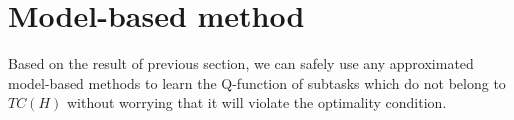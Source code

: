 \documentclass{article} %
\newtheorem{theorem}{Theorem}
\begin{document}







\section{Model-based method}
\label{se:Model}

Based on the result of previous section, we can safely use any approximated model-based methods 
to learn the Q-function of subtasks which do not belong to $TC(H)$ without worrying
that it will violate the optimality condition.
\end{document}
